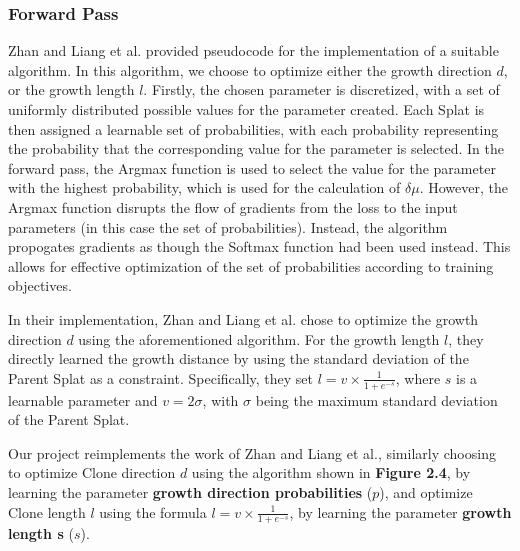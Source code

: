 \documentclass[11pt]{report}
\begin{document}
\subsubsection{Forward Pass}
Zhan and Liang et al. provided pseudocode for the implementation of a suitable algorithm. In this algorithm, we choose to optimize either the growth direction $d$, or the growth length $l$. Firstly, the chosen parameter is discretized, with a set of uniformly distributed possible values for the parameter created. Each Splat is then assigned a learnable set of probabilities, with each probability representing the probability that the corresponding value for the parameter is selected. In the forward pass, the Argmax function is used to select the value for the parameter with the highest probability, which is used for the calculation of $\delta \mu$. However, the Argmax function disrupts the flow of gradients from the loss to the input parameters (in this case the set of probabilities). Instead, the algorithm propogates gradients as though the Softmax function had been used instead. This allows for effective optimization of the set of probabilities according to training objectives.

\begin{center} %
    \begin{minipage}{0.70\textwidth}
        \begin{algorithm}[H]
        
        \end{algorithm}
\end{minipage}
\end{center}

In their implementation, Zhan and Liang et al. chose to optimize the growth direction $d$ using the aforementioned algorithm. For the growth length $l$, they directly learned the growth distance by using the standard deviation of the Parent Splat as a constraint. Specifically, they set $l = v \times \frac{1}{1 + e^{-s}}$, where $s$ is a learnable parameter and $v = 2 \sigma$, with $\sigma$ being the maximum standard deviation of the Parent Splat.

Our project reimplements the work of Zhan and Liang et al., similarly choosing to optimize Clone direction $d$ using the algorithm shown in \textbf{Figure 2.4}, by learning the parameter \textbf{growth direction probabilities} ($p$), and optimize Clone length $l$ using the formula $l = v \times \frac{1}{1 + e^{-s}}$, by learning the parameter \textbf{growth length s} ($s$).
\end{document}
